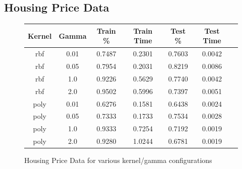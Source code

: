 \documentclass[h]{article}
\begin{document}
\subsection*{Housing Price Data}

\begin{figure}[H]
\begin{tabular}{ | c | c  | c | c | c | c | c |} 
\hline
\textbf{Kernel} & \textbf{Gamma} & \textbf{Train \%} & \textbf{Train Time} & \textbf{Test \%} & \textbf{Test Time}   \\ \hline
rbf & 0.01 & 0.7487 & 0.2301 & 0.7603 & 0.0042 \\ \hline
rbf & 0.05 & 0.7954 & 0.2031 & 0.8219 & 0.0086 \\ \hline
rbf & 1.0 & 0.9226 & 0.5629 & 0.7740 & 0.0042 \\ \hline
rbf & 2.0 & 0.9502 & 0.5996 & 0.7397 & 0.0051 \\ \hline
poly & 0.01 & 0.6276 & 0.1581 & 0.6438 & 0.0024 \\ \hline
poly & 0.05 & 0.7333 & 0.1733 & 0.7534 & 0.0028 \\ \hline
poly & 1.0 & 0.9333 & 0.7254 & 0.7192 & 0.0019 \\ \hline
poly & 2.0 & 0.9280 & 1.0244 & 0.6781 & 0.0019 \\ \hline


\hline
\end{tabular}
\caption*{Housing Price Data for various kernel/gamma configurations}
\endminipage\hfill
\end{figure}
\end{document}
